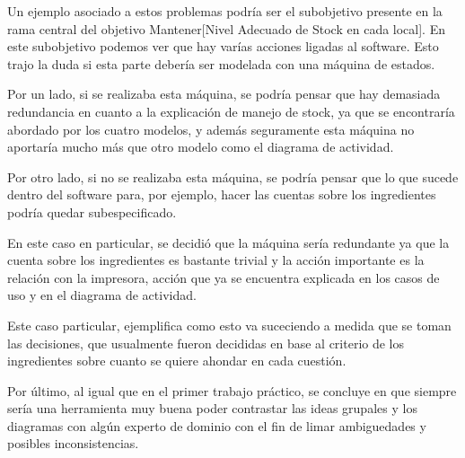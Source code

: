 \documentclass[a4paper,10pt]{article}
\begin{document}
Un ejemplo asociado a estos problemas podr\'ia ser el subobjetivo presente en la rama central del objetivo Mantener[Nivel Adecuado de Stock en cada local].
En este subobjetivo podemos ver que hay var\'ias acciones ligadas al software. Esto trajo la duda si esta parte deber\'ia ser modelada con una
m\'aquina de estados.

 Por un lado, si se realizaba esta m\'aquina, se podr\'ia pensar que hay demasiada redundancia en cuanto a la explicaci\'on
de manejo de stock, ya que se encontrar\'ia abordado por los cuatro modelos, y adem\'as seguramente esta m\'aquina no aportar\'ia mucho m\'as que otro
modelo como el diagrama de actividad.

Por otro lado, si no se realizaba esta m\'aquina, se podr\'ia pensar que lo que sucede dentro del software para, por ejemplo, hacer las cuentas sobre los ingredientes
podr\'ia quedar subespecificado.

En este caso en particular, se decidi\'o que la m\'aquina ser\'ia redundante ya que la cuenta sobre los ingredientes es bastante trivial y la acci\'on importante
es la relaci\'on con la impresora, acci\'on que ya se encuentra explicada en los casos de uso y en el diagrama de actividad.

Este caso particular, ejemplifica como esto va suceciendo a medida que se toman las decisiones, que usualmente fueron decididas en base al 
criterio de los ingredientes sobre cuanto se quiere ahondar en cada cuesti\'on.

\medskip

Por \'ultimo, al igual que en el primer trabajo pr\'actico, se concluye en que siempre ser\'ia una herramienta muy buena poder contrastar
las ideas grupales y los diagramas con alg\'un experto de dominio con el fin de limar ambiguedades y posibles inconsistencias.
\end{document}
